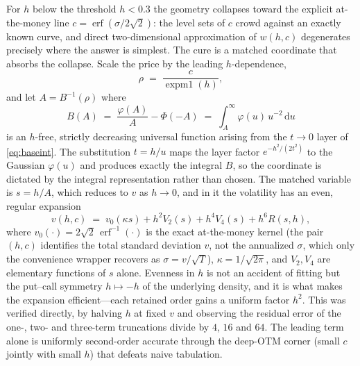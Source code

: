 \documentclass[11pt]{article}
\newcommand{\erf}{\operatorname{erf}}
\newcommand{\PhiN}{\Phi}
\newcommand{\expmone}{\operatorname{expm1}}
\begin{document}
For $h$ below the threshold $h<0.3$ the geometry collapses toward the explicit at-the-money line $c=\erf(\sigma/2\sqrt2)$: the level sets of $c$ crowd against an exactly known curve, and direct two-dimensional approximation of $w(h,c)$ degenerates precisely where the answer is simplest. The cure is a matched coordinate that absorbs the collapse. Scale the price by the leading $h$-dependence,
\begin{equation}
  \rho \;=\; \frac{c}{\expmone(h)},
\end{equation}
and let $A=B^{-1}(\rho)$ where
\begin{equation}
  B(A)\;=\;\frac{\varphi(A)}{A}-\PhiN(-A)\;=\;\int_A^\infty \varphi(u)\,u^{-2}\,\mathrm{d}u
\end{equation}
is an $h$-free, strictly decreasing universal function arising from the $t\to0$ layer of \eqref{eq:baseint}. The substitution $t=h/u$ maps the layer factor $e^{-h^2/(2t^2)}$ to the Gaussian $\varphi(u)$ and produces exactly the integral $B$, so the coordinate is dictated by the integral representation rather than chosen. The matched variable is $s=h/A$, which reduces to $v$ as $h\to0$, and in it the volatility has an even, regular expansion
\begin{equation}
  v(h,c) \;=\; v_0(\kappa s) + h^2V_2(s) + h^4V_4(s) + h^6 R(s,h),
  \label{eq:leftchart}
\end{equation}
where $v_0(\cdot)=2\sqrt2\,\erf^{-1}(\cdot)$ is the exact at-the-money kernel (the pair $(h,c)$ identifies the total standard deviation $v$, not the annualized $\sigma$, which only the convenience wrapper recovers as $\sigma=v/\sqrt T$), $\kappa=1/\sqrt{2\pi}$, and $V_2,V_4$ are elementary functions of $s$ alone. Evenness in $h$ is not an accident of fitting but the put--call symmetry $h\mapsto-h$ of the underlying density, and it is what makes the expansion efficient---each retained order gains a uniform factor $h^2$. This was verified directly, by halving $h$ at fixed $v$ and observing the residual error of the one-, two- and three-term truncations divide by $4$, $16$ and $64$. The leading term alone is uniformly second-order accurate through the deep-OTM corner (small $c$ jointly with small $h$) that defeats naive tabulation.
\end{document}
